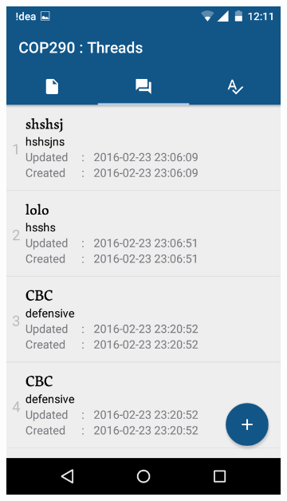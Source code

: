 \documentclass{article}
\begin{document}
\begin{itemize}
\begin{figure}[!h]
\begin{subfigure}{.4\textwidth}
	\includegraphics[width=0.8\linewidth]{pic7}
    \caption*{}
\end{subfigure}
\begin{subfigure}{.4\textwidth}
  \centering

\end{subfigure}
\end{figure}
\end{itemize}
\end{document}
